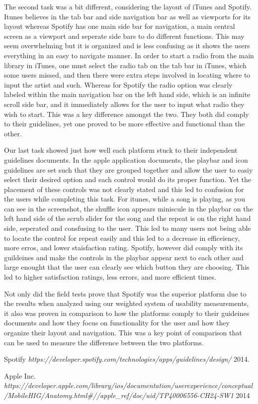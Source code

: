 \documentclass[a4paper]{article}
\begin{document}
The second task was a bit different, considering the layout of iTunes and Spotify. Itunes believes in the tab bar and side navigation bar as well as viewports for its layout whereas Spotify has one main side bar for navigation, a main central screen as a viewport and seperate side bars to do different functions. This may seem overwhelming but it is organized and is less confusing as it shows the users everything in an easy to navigate manner. In order to start a radio from the main library in iTunes, one must select the radio tab on the tab bar in iTunes, which some users missed, and then there were extra steps involved in locating where to input the artist and such. Whereas for Spotify the radio option was clearly labeled within the main navigation bar on the left hand side, which is an infinite scroll side bar, and it immediately allows for the user to input what radio they wish to start. This was a key difference amongst the two. They both did comply to their guidelines, yet one proved to be more effective and functional than the other.

Our last task showed just how well each platform stuck to their independent guidelines documents. In the apple application documents, the playbar and icon guidelines are set such that they are grouped together and allow the user to easiy select their desired option and each control would do its proper function. Yet the placement of these controls was not clearly stated and this led to confusion for the users while completing this task. For itunes, while a song is playing, as you can see in the screenshot, the shuffle icon appears miniscule in the playbar on the left hand side of the scrub slider for the song and the repeat is on the right hand side, seperated and consfusing to the user. This led to many users not being able to locate the control for repeat easily and this led to a decrease in efficeiency, more erros, and lower staisfaction rating. Spotify, however did comply with its guildeines and make the controls in the playbar appear next to each other and large enought that the user can clearly see which button they are choosing. This led to higher satisfaction ratings, less errors, and more efficient times.

Not only did the field tests prove that Spotify was the superior platform due to the results when analyzed using our weighted system of usability measurements, it also was proven in comparison to how the platforms comply to their guideines documents and how they focus on functionality for the user and how they organize their layout and navigation. This was a key point of comparison that can be used to measure the difference between the two platforms.

\begin{thebibliography}{1}

 Spotify {\em https://developer.spotify.com/technologies/apps/guidelines/design/}  2014.

  Apple Inc. {\em https://developer.apple.com/library/ios/documentation/userexperience/conceptual/MobileHIG/Anatomy.html#//apple_ref/doc/uid/TP40006556-CH24-SW1} 2014

\end{thebibliography}
\end{document}
